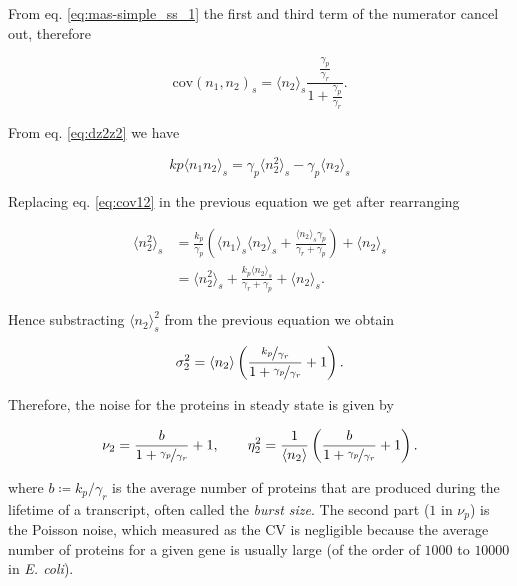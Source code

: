 From eq. \eqref{eq:mas-simple_ss_1} the first and third term of the numerator cancel out, therefore

\begin{equation}
  \label{eq:cov12}
  \boxed{\text{cov}(n_1,n_2)_s = \langle n_2 \rangle_s\frac{\frac{\gamma_p}{\gamma_r}}{1+\frac{\gamma_p}{\gamma_r}}}.
\end{equation}

From eq. \ref{eq:dz2z2} we have

\begin{equation*}
kp\langle n_1n_2\rangle_s = \gamma_p\langle n_2^2\rangle_s-\gamma_p\langle n_2\rangle_s
\end{equation*}

Replacing eq. \ref{eq:cov12} in the previous equation we get after rearranging

\begin{align*}
  \langle n_2^2\rangle_s &= \frac{k_p}{\gamma_p}\left(\langle n_1 \rangle_s\langle n_2\rangle_s + \frac{\langle n_2\rangle_s\gamma_p}{\gamma_r+\gamma_p}\right) + \langle n_2 \rangle_s\\
  &=\langle n_2^2\rangle_s+\frac{k_p\langle n_2\rangle_s}{\gamma_r+\gamma_p}+\langle n_2 \rangle_s.
\end{align*}

Hence substracting $\langle n_2\rangle_s^2$ from the previous equation we obtain

\begin{equation*}
  \sigma_2^2 = \langle n_2\rangle\left(\frac{\nicefrac{k_p}{\gamma_r}}{1+\nicefrac{\gamma_p}{\gamma_r}}+1\right).
\end{equation*}

Therefore, the noise for the proteins in steady state is given by

\begin{equation}
  \label{eq:noise2}
  \nu_2 = \frac{b}{1+\nicefrac{\gamma_p}{\gamma_r}}+1, \quad \quad \eta_2^2 = \frac{1}{\langle n_2\rangle}\left(\frac{b}{1+\nicefrac{\gamma_p}{\gamma_r}}+1\right).
\end{equation}


where $b\coloneqq k_p/\gamma_r$ is the average number of proteins that are produced during the lifetime of a transcript, often called the \textit{burst size}. The second part ($1$ in $\nu_p$) is the Poisson noise, which measured as the CV is negligible because the average number of proteins for a given gene is usually large (of the order of $1000$ to $10000$ in \textit{E. coli}).


